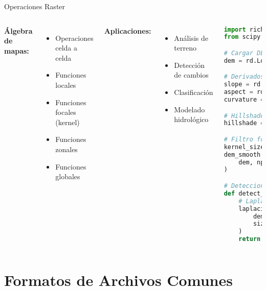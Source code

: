 \documentclass[10pt]{beamer}
\begin{document}
\begin{frame}[fragile]{Operaciones Raster}
    \begin{columns}
        \textbf{Álgebra de mapas:}
        \begin{itemize}
            \item Operaciones celda a celda
            \item Funciones locales
            \item Funciones focales (kernel)
            \item Funciones zonales
            \item Funciones globales
        \end{itemize}
        
        \vspace{0.3cm}
        \textbf{Aplicaciones:}
        \begin{itemize}
            \item Análisis de terreno
            \item Detección de cambios
            \item Clasificación
            \item Modelado hidrológico
        \end{itemize}
        
        \begin{lstlisting}[language=Python, caption=Análisis de terreno]
import richdem as rd
from scipy.ndimage import generic_filter

# Cargar DEM
dem = rd.LoadGDAL("srtm_chile.tif")

# Derivados del terreno
slope = rd.TerrainAttribute(dem, 'slope_degrees')
aspect = rd.TerrainAttribute(dem, 'aspect')
curvature = rd.TerrainAttribute(dem, 'curvature')

# Hillshade
hillshade = rd.hillshade(dem, azimuth=315)

# Filtro focal (media móvil 3x3)
kernel_size = 3
dem_smooth = generic_filter(
    dem, np.mean, size=kernel_size
)

# Deteccion de crestas
def detect_ridges(dem):
    # Laplaciano
    laplacian = generic_filter(
        dem, lambda x: x[4] - x.mean(), 
        size=(3,3)
    )
    return laplacian > threshold
        \end{lstlisting}
    \end{columns}
\end{frame}

\section{Formatos de Archivos Comunes}
\end{document}
